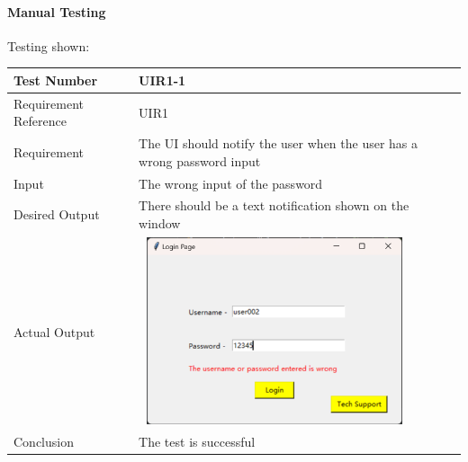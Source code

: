 \documentclass[12pt, titlepage]{article}
\begin{document}
\paragraph{Manual Testing}{Testing shown:}
\begin{table}[H]
\begin{center}
\begin{tabular}{|l | m{9cm}|}
\hline
  Test Number & UIR1-1\\
  \hline
  Requirement Reference & UIR1\\
  \hline
  Requirement & The UI should notify the user when the user has a wrong password input \\
  \hline
  Input & The wrong input of the password\\
  \hline
  Desired Output & There should be a text notification shown on the window\\
  \hline
  Actual Output & \includegraphics[width=80mm, height=55mm]{UIR11.png}\\
  \hline
  Conclusion & The test is successful\\
  \hline
\end{tabular}
\end{center}           
\end{table}
\end{document}
